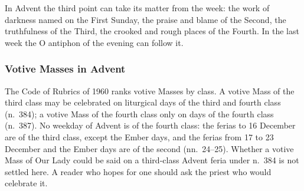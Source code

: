 \noindent In Advent the third point can take its matter from the week: the work of darkness named
on the First Sunday, the praise and blame of the Second, the truthfulness of the Third, the crooked
and rough places of the Fourth. In the last week the O antiphon of the evening can follow it.

\subsubsection{Votive Masses in Advent}

The Code of Rubrics of 1960 ranks votive Masses by class. A votive Mass of the third class may be
celebrated on liturgical days of the third and fourth class (n.~384); a votive Mass of the fourth
class only on days of the fourth class (n.~387). No weekday of Advent is of the fourth class: the
ferias to 16 December are of the third class, except the Ember days, and the ferias from 17 to 23
December and the Ember days are of the second (nn.~24--25). Whether a votive Mass of Our Lady could
be said on a third-class Advent feria under n.~384 is not settled here. A reader who hopes for one
should ask the priest who would celebrate it.
